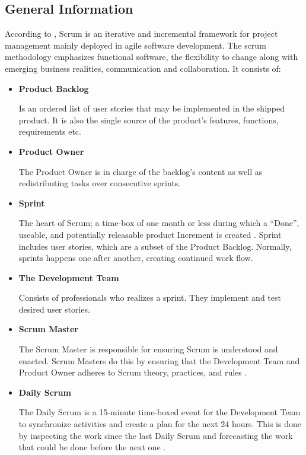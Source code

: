 \documentclass{report}
\begin{document}
\subsection{General Information}
According to \cite{scrum_definition}, Scrum is an iterative and incremental framework for project management mainly deployed in agile software development. The scrum methodology emphasizes functional software, the flexibility to change along with emerging business realities, communication and collaboration. It consists of:
\begin{itemize}
\item \textbf{Product Backlog}

Is an ordered list of user stories that may be implemented in the shipped product. It is also the single source of the product's features, functions, requirements etc. 

\item \textbf{Product Owner}

The Product Owner is in charge of the backlog's content as well as redistributing tasks over consecutive sprints.

\item \textbf{Sprint}

The heart of Scrum; a time-box of one month or less during which a “Done”, useable, and potentially releasable product Increment is created \cite{scrum_guide}. Sprint includes user stories, which are a subset of the Product Backlog. Normally, sprints happens one after another, creating continued work flow. 

\item \textbf{The Development Team}

Consists of professionals who realizes a sprint. They implement and test desired user stories.

\item \textbf{Scrum Master}

The Scrum Master is responsible for ensuring Scrum is understood and enacted. Scrum Masters do this by ensuring that the Development Team and Product Owner adheres to Scrum theory, practices, and rules \cite{scrum_guide}.

\item \textbf{Daily Scrum}

The Daily Scrum is a 15-minute time-boxed event for the Development Team to synchronize activities and create a plan for the next 24 hours. This is done by inspecting the work since the last Daily Scrum and forecasting the work that could be done before the next one \cite{scrum_guide}. 

\end{itemize}
\end{document}
